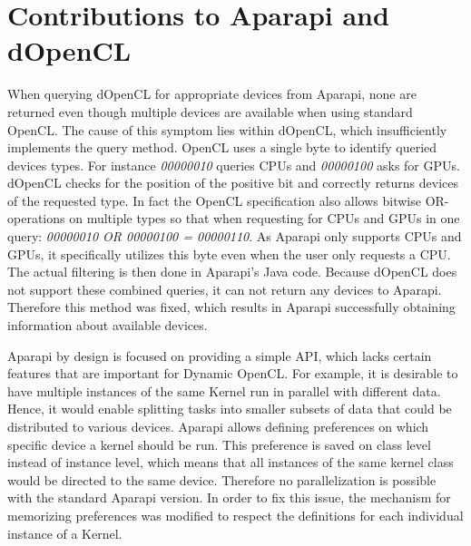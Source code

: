 \section*{Contributions to Aparapi and dOpenCL}
\begin{description}[style=nextline]
	\item [No available devices]
	When querying dOpenCL for appropriate devices from Aparapi, none are returned even though multiple devices are available when using standard OpenCL. The cause of this symptom lies within dOpenCL, which insufficiently implements the query method. OpenCL uses a single byte to identify queried devices types. For instance \textit{00000010} queries CPUs and \textit{00000100} asks for GPUs. dOpenCL checks for the position of the positive bit and correctly returns devices of the requested type. In fact the OpenCL specification also allows bitwise OR-operations on multiple types so that when requesting for CPUs and GPUs in one query: \textit{00000010 OR 00000100 = 00000110}. As Aparapi only supports CPUs and GPUs, it specifically utilizes this byte even when the user only requests a CPU. The actual filtering is then done in Aparapi's Java code. Because dOpenCL does not support these combined queries, it can not return any devices to Aparapi. Therefore this method was fixed, which results in Aparapi successfully obtaining information about available devices.

	\item [Specific device choice]
	Aparapi by design is focused on providing a simple API, which lacks certain features that are important for Dynamic OpenCL. For example, it is desirable to have multiple instances of the same Kernel run in parallel with different data. Hence, it would enable splitting tasks into smaller subsets of data that could be distributed to various devices. Aparapi allows defining preferences on which specific device a kernel should be run. This preference is saved on class level instead of instance level, which means that all instances of the same kernel class would be directed to the same device. Therefore no parallelization is possible with the standard Aparapi version. In order to fix this issue, the mechanism for memorizing preferences was modified to respect the definitions for each individual instance of a Kernel.


\end{description}
